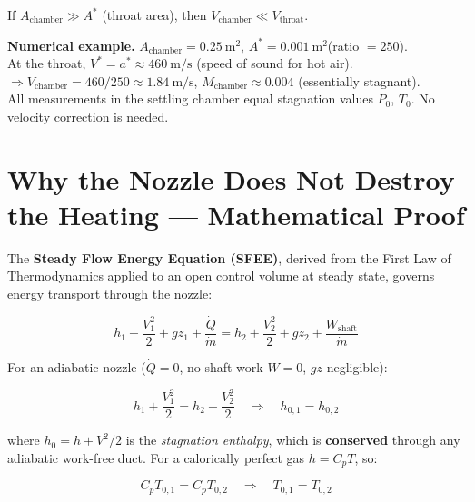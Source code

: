 \documentclass[12pt,a4paper]{report}
\begin{document}
\noindent If $A_\text{chamber} \gg A^*$ (throat area), then
$V_\text{chamber} \ll V_\text{throat}$.

\begin{resultbox}
\textbf{Numerical example.}
$A_\text{chamber} = 0.25\ \text{m}^2$,\quad
$A^* = 0.001\ \text{m}^2$\quad (ratio $= 250$).\\[4pt]
At the throat, $V^* = a^* \approx 460\ \text{m/s}$ (speed of sound for hot air).\\
$\Rightarrow V_\text{chamber} = 460/250 \approx 1.84\ \text{m/s}$,\quad
$M_\text{chamber} \approx 0.004$ (essentially stagnant).\\[4pt]
All measurements in the settling chamber equal stagnation values $P_0$, $T_0$.
No velocity correction is needed.
\end{resultbox}

\section{Why the Nozzle Does Not Destroy the Heating — Mathematical Proof}

The \textbf{Steady Flow Energy Equation (SFEE)}, derived from the First Law of
Thermodynamics applied to an open control volume at steady state, governs
energy transport through the nozzle:

\begin{formulabox}
\begin{equation}
  h_1 + \frac{V_1^2}{2} + gz_1 + \frac{\dot{Q}}{\dot{m}}
  = h_2 + \frac{V_2^2}{2} + gz_2 + \frac{W_\text{shaft}}{\dot{m}}
  \label{eq:sfee}
\end{equation}
\end{formulabox}

For an adiabatic nozzle ($\dot{Q}=0$, no shaft work $W=0$, $gz$
negligible):

\begin{equation}
  h_1 + \frac{V_1^2}{2} = h_2 + \frac{V_2^2}{2}
  \quad\Longrightarrow\quad
  h_{0,1} = h_{0,2}
\end{equation}

where $h_0 = h + V^2/2$ is the \textit{stagnation enthalpy}, which is
\textbf{conserved} through any adiabatic work-free duct. For a calorically
perfect gas $h = C_p T$, so:

\begin{equation}
  C_p T_{0,1} = C_p T_{0,2}
  \quad\Longrightarrow\quad
  \boxed{T_{0,1} = T_{0,2}}
  \label{eq:t0conserved}
\end{equation}
\end{document}
